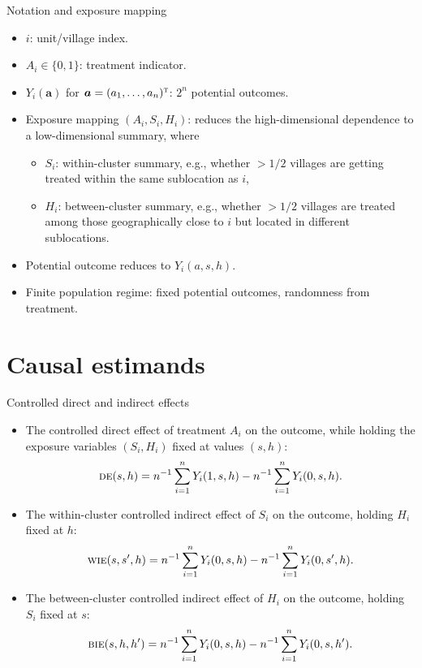 \documentclass[aspectratio=169]{beamer}
\def\T{{\textsc{t}}}
\newcommand{\ba}{\boldsymbol{a}}
\newcommand{\sumi}{\sum_{i=1}^n}
\newcommand{\de}{\textsc{de}}
\newcommand{\bie}{\textsc{bie}}
\newcommand{\wie}{\textsc{wie}}
\begin{document}
\begin{frame}{Notation and exposure mapping}
\begin{itemize}
\item $i$: unit/village index.
\item $A_i\in\{0,1\}$: treatment indicator.
\item $Y_i(\ba)$ for $\ba = (a_1,\ldots,a_n)^{\T}$: $2^n$ potential outcomes.
\pause
\item Exposure mapping $(A_i, S_i, H_i)$: reduces the high-dimensional dependence to a low-dimensional summary, where
\pause
\begin{itemize}
    \item $S_i$: within-cluster summary, e.g., whether $>1/2$ villages are getting treated within the same sublocation as $i$,
    \pause
    \item $H_i$: between-cluster summary, e.g., whether $>1/2$ villages are treated among those geographically close to $i$ but located in different sublocations.
\end{itemize}
\pause
\item Potential outcome reduces to $Y_i(a,s,h)$.
\pause
\item Finite population regime: fixed potential outcomes, randomness from treatment.
\end{itemize}
\end{frame}


\section{Causal estimands}

\begin{frame}{Controlled direct and indirect effects}
\begin{itemize}
    \item The controlled direct effect of treatment $A_{i}$ on the outcome, while holding the exposure variables $(S_{i},H_{i})$ fixed at values $(s,h)$:
    {\small 
    \[
    \de(s,h) = n^{-1}\sumi Y_{i}(1,s,h) - n^{-1}\sumi Y_{i}(0,s,h).
    \]
    }
    \pause
    \item The within-cluster controlled indirect effect of $S_{i}$ on the outcome, holding $H_{i}$ fixed at $h$:
    {\small 
    \[
    \wie(s,s^{\prime},h) = n^{-1}\sumi Y_{i}(0,s,h) - n^{-1}\sumi Y_{i}(0,s^{\prime},h).
    \]
    }
    \pause
    \item The between-cluster controlled indirect effect of $H_{i}$ on the outcome, holding $S_{i}$ fixed at $s$:
    {\small
    \[
    \bie(s,h,h^{\prime}) = n^{-1}\sumi Y_{i}(0,s,h) - n^{-1}\sumi Y_{i}(0,s,h^{\prime}).
    \]
    }
\end{itemize}
\end{frame}
\end{document}
